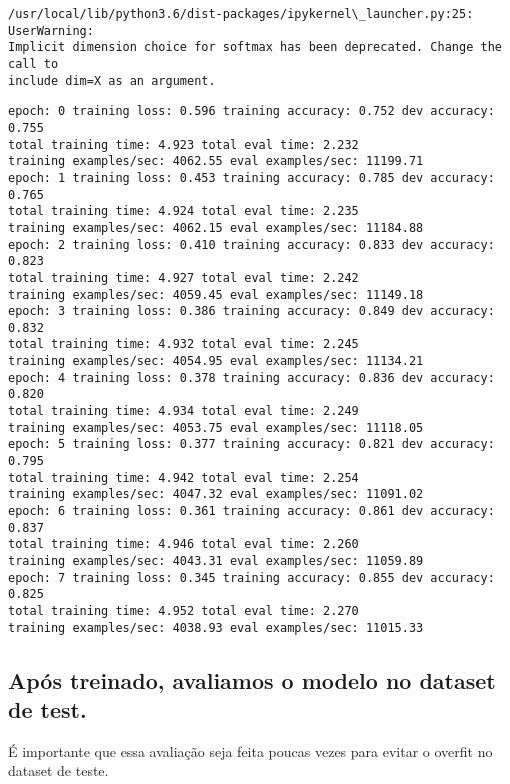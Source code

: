 \documentclass[10pt]{article}
\begin{document}
    \begin{Verbatim}[commandchars=\\\{\}]
/usr/local/lib/python3.6/dist-packages/ipykernel\_launcher.py:25: UserWarning:
Implicit dimension choice for softmax has been deprecated. Change the call to
include dim=X as an argument.
    \end{Verbatim}

    \begin{Verbatim}[commandchars=\\\{\}]
epoch: 0 training loss: 0.596 training accuracy: 0.752 dev accuracy: 0.755
total training time: 4.923 total eval time: 2.232
training examples/sec: 4062.55 eval examples/sec: 11199.71
epoch: 1 training loss: 0.453 training accuracy: 0.785 dev accuracy: 0.765
total training time: 4.924 total eval time: 2.235
training examples/sec: 4062.15 eval examples/sec: 11184.88
epoch: 2 training loss: 0.410 training accuracy: 0.833 dev accuracy: 0.823
total training time: 4.927 total eval time: 2.242
training examples/sec: 4059.45 eval examples/sec: 11149.18
epoch: 3 training loss: 0.386 training accuracy: 0.849 dev accuracy: 0.832
total training time: 4.932 total eval time: 2.245
training examples/sec: 4054.95 eval examples/sec: 11134.21
epoch: 4 training loss: 0.378 training accuracy: 0.836 dev accuracy: 0.820
total training time: 4.934 total eval time: 2.249
training examples/sec: 4053.75 eval examples/sec: 11118.05
epoch: 5 training loss: 0.377 training accuracy: 0.821 dev accuracy: 0.795
total training time: 4.942 total eval time: 2.254
training examples/sec: 4047.32 eval examples/sec: 11091.02
epoch: 6 training loss: 0.361 training accuracy: 0.861 dev accuracy: 0.837
total training time: 4.946 total eval time: 2.260
training examples/sec: 4043.31 eval examples/sec: 11059.89
epoch: 7 training loss: 0.345 training accuracy: 0.855 dev accuracy: 0.825
total training time: 4.952 total eval time: 2.270
training examples/sec: 4038.93 eval examples/sec: 11015.33
    \end{Verbatim}

    \hypertarget{apuxf3s-treinado-avaliamos-o-modelo-no-dataset-de-test.}{%
\subsection{Após treinado, avaliamos o modelo no dataset de
test.}\label{apuxf3s-treinado-avaliamos-o-modelo-no-dataset-de-test.}}

É importante que essa avaliação seja feita poucas vezes para evitar o
overfit no dataset de teste.
\end{document}
